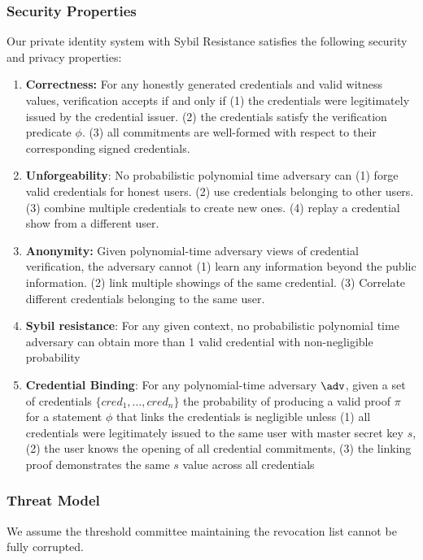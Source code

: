 \subsubsection{Security Properties}
Our private identity system with Sybil Resistance satisfies the following security and privacy properties:
\begin{enumerate}
    \item \textbf{Correctness: } For any honestly generated credentials and valid witness values, verification accepts if and only if (1) the credentials were legitimately issued by the credential issuer. (2) the credentials satisfy the verification predicate $\phi$. (3) all commitments are well-formed with respect to their corresponding signed credentials. 
    
    \item \textbf{Unforgeability}: No probabilistic polynomial time adversary can (1) forge valid credentials for honest users. (2) use credentials belonging to other users. (3) combine multiple credentials to create new ones. (4) replay a credential show from a different user. 
    
    \item \textbf{Anonymity:} Given polynomial-time adversary views of credential verification, the adversary cannot (1) learn any information beyond the public information. (2) link multiple showings of the same credential. (3) Correlate different credentials belonging to the same user.
    
    \item \textbf{Sybil resistance}: For any given context, no probabilistic polynomial time adversary can obtain more than 1 valid credential with non-negligible probability 

    \item \textbf{Credential Binding}: For any polynomial-time adversary $\adv$, given a set of credentials $\{cred_1, \dots, cred_n\}$ the probability of producing a valid proof $\pi$ for a statement $\phi$ that links the credentials is negligible unless (1) all credentials were legitimately issued to the same user with master secret key $s$, (2) the user knows the opening of all credential commitments, (3) the linking proof demonstrates the same $s$ value across all credentials

\end{enumerate}

\subsubsection{Threat Model}
We assume the threshold committee maintaining the revocation list cannot be fully corrupted.

